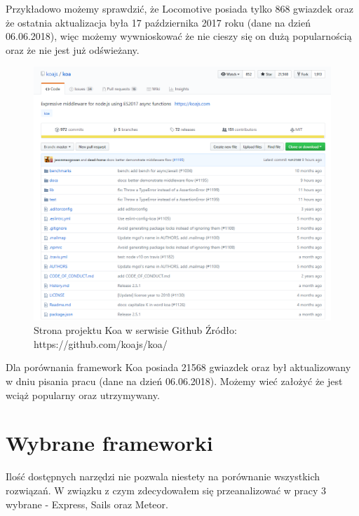 \documentclass[12pt]{report}
\begin{document}
    Przykładowo możemy sprawdzić, że Locomotive posiada tylko 868 gwiazdek oraz że ostatnia aktualizacja była 17 października 2017 roku (dane na dzień 06.06.2018), więc możemy wywnioskować że nie cieszy się on dużą popularnością oraz że nie jest już odświeżany.
    \pagebreak
    \begin{figure}[H]
      \centering
      \includegraphics[width=\textwidth,height=\textheight,keepaspectratio]{koa.png} 
      \caption{Strona projektu Koa w serwisie Github \newline Źródło: https://github.com/koajs/koa/}
    \end{figure}
    Dla porównania framework Koa posiada 21568 gwiazdek oraz był aktualizowany w dniu pisania pracu (dane na dzień 06.06.2018).
    Możemy wieć założyć że jest wciąż popularny oraz utrzymywany.
    \pagebreak

  \section{Wybrane frameworki}
    Ilość dostępnych narzędzi nie pozwala niestety na porównanie wszystkich rozwiązań.
    W związku z czym zdecydowałem się przeanalizować w pracy 3 wybrane - Express, Sails oraz Meteor.
\end{document}
